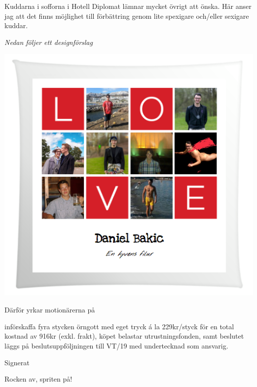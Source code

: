 \documentclass[../_main/handlingar.tex]{subfiles}
\begin{document}
Kuddarna i sofforna i Hotell Diplomat lämnar mycket övrigt att önska. Här
anser jag att det finns möjlighet till förbättring genom lite spexigare och/eller
sexigare kuddar.

\textit{Nedan följer ett designförslag}

\begin{center}
  \includegraphics[scale=0.5]{../_res/kudde.png}
\end{center}

Därför yrkar motionärerna på
\begin{attsatser}
  \att införskaffa fyra stycken örngott med eget tryck á la 229kr/styck för en total kostnad av 916kr (exkl. frakt),
  \att köpet belastar utrustningsfonden, samt
  \att beslutet läggs på beslutsuppföljningen till VT/19 med undertecknad som ansvarig.
\end{attsatser}

\begin{signatures}{1}
    Signerat
    \signature{Brödraskapet}{Rocken av, spriten på!}

\end{signatures}
\end{document}

